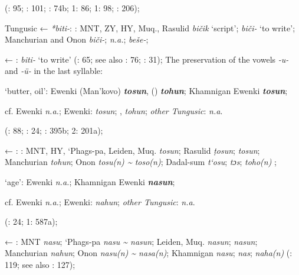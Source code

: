\documentclass[output=paper,colorlinks,citecolor=brown]{langscibook}
\begin{document}
    (\citealt{Castrén1856}: 95; \citealt{Janhunen1991}: 101; \citealt{Dorji1998}: 74b; \citealt{Cincius1975B} 1: 86; \citealt{Hauer1952} 1: 98; \citealt{Zikmundová2013a}: 206);

    Tungusic ←  \textit{*biti-}: : MNT, ZY, HY, Muq., Rasulid \textit{bičik} ‘script’;  \textit{biči-} ‘to write’; Manchurian and Onon  \textit{biči-};  \textit{n.a.};  \textit{beše-};

     ← :  \textit{biti-} ‘to write’ (\citealt{Khabtagaeva2017}: 65; see also \citealt{Doerfer1985}: 76; \citealt{Rozycki1994}: 31);
\z
\pagebreak
    \ex The preservation of the vowels \textit{-u-} and \textit{-ü-} in the last syllable:

\ea ‘butter, oil’:  Ewenki (Man’kovo) \textbf{\textit{tosun}}, () \textbf{\textit{tohun}}; Khamnigan Ewenki \textbf{\textit{tosun}};

    cf.  Ewenki \textit{n.a.};  Ewenki:  \textit{tosun}; ,  \textit{tohun}; \textit{other Tungusic}: \textit{n.a}.
    
    (\citealt{Castrén1856}: 88; \citealt{Janhunen1991}: 24; \citealt{Vasilevic1958}: 395b; \citealt{Cincius1975B} 2: 201a);

    ← : : MNT, HY, ‘Phags{}-pa, Leiden, Muq. \textit{tosun}; Rasulid \textit{ṭosun};  \textit{tosun}; Manchurian  \textit{tohun}; Onon  \textit{tosu(n) {\textasciitilde} toso(n)}; Dadal-sum  \textit{t`osu};  \textit{tɔs};  \textit{toho(n)} \citep[134]{Khabtagaeva2017};

    \ex ‘age’:  Ewenki \textit{n.a.}; Khamnigan Ewenki \textbf{\textit{nasun}};

    cf.  Ewenki \textit{n.a.};  Ewenki:  \textit{nahun}; \textit{other Tungusic}: \textit{n.a}.
    
    (\citealt{Janhunen1991}: 24; \citealt{Cincius1975B} 1: 587a);

    ← : MNT \textit{nasu}; ‘Phags-pa \textit{nasu {\textasciitilde} nasun}; Leiden, Muq. \textit{nasun};  \textit{nasun}; Manchurian  \textit{nahun}; Onon  \textit{nasu(n) {\textasciitilde} nasa(n)};  Khamnigan \textit{nasu};  \textit{nas};  \textit{naha(n)} (\citealt{Khabtagaeva2017}: 119; see also \citealt{Doerfer1985}: 127);
\end{document}
